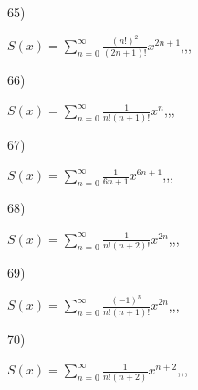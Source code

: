\documentclass[11pt, ukrainian]{article}
\begin{document}
\par
\vspace{0.9cm}
65) \space 
{%
{$S(x)=\sum\limits_{n=0}^{\infty}{\frac{(n!)^2}{(2n+1)!}}{x^{{2n+1}}}$},,, \par \smallskip  
}
\par
\vspace{0.9cm}
66) \space 
{%
{$S(x)=\sum\limits_{n=0}^{\infty}{\frac{1}{n!(n+1)!}}{x^{{n}}}$},,, \par \smallskip  
}
\par
\vspace{0.9cm}
67) \space 
{%
{$S(x)=\sum\limits_{n=0}^{\infty}{\frac{1}{6n+1}}{x^{{6n+1}}}$},,, \par \smallskip  
}
\par
\vspace{0.9cm}
68) \space 
{%
{$S(x)=\sum\limits_{n=0}^{\infty}{\frac{1}{n!(n+2)!}}{x^{{2n}}}$},,, \par \smallskip  
}
\par
\vspace{0.9cm}
69) \space 
{%
{$S(x)=\sum\limits_{n=0}^{\infty}{\frac{(-1)^n}{n!(n+1)!}}{x^{{2n}}}$},,, \par \smallskip  
}
\par
\vspace{0.9cm}
70) \space 
{%
{$S(x)=\sum\limits_{n=0}^{\infty}{\frac{1}{n!(n+2)}}{x^{{n+2}}}$},,, \par \smallskip  
}
\end{document}
